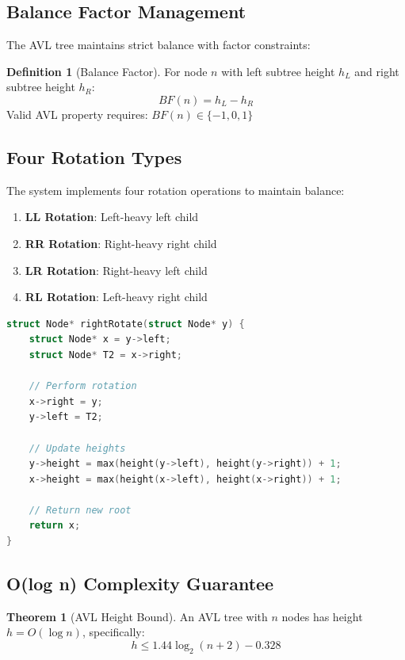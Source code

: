 \documentclass[12pt,a4paper]{report}
\theoremstyle{definition}
\newtheorem{definition}{Definition}[chapter]
\newtheorem{theorem}{Theorem}[chapter]
\begin{document}
\subsection{Balance Factor Management}

The AVL tree maintains strict balance with factor constraints:

\begin{definition}[Balance Factor]
For node $n$ with left subtree height $h_L$ and right subtree height $h_R$:
$$BF(n) = h_L - h_R$$
Valid AVL property requires: $BF(n) \in \{-1, 0, 1\}$
\end{definition}

\subsection{Four Rotation Types}

The system implements four rotation operations to maintain balance:

\begin{enumerate}
    \item \textbf{LL Rotation}: Left-heavy left child
    \item \textbf{RR Rotation}: Right-heavy right child
    \item \textbf{LR Rotation}: Right-heavy left child
    \item \textbf{RL Rotation}: Left-heavy right child
\end{enumerate}

\begin{lstlisting}[language=C, caption=AVL Rotation Implementation]
struct Node* rightRotate(struct Node* y) {
    struct Node* x = y->left;
    struct Node* T2 = x->right;
    
    // Perform rotation
    x->right = y;
    y->left = T2;
    
    // Update heights
    y->height = max(height(y->left), height(y->right)) + 1;
    x->height = max(height(x->left), height(x->right)) + 1;
    
    // Return new root
    return x;
}
\end{lstlisting}

\subsection{O(log n) Complexity Guarantee}

\begin{theorem}[AVL Height Bound]
An AVL tree with $n$ nodes has height $h = O(\log n)$, specifically:
$$h \leq 1.44 \log_2(n+2) - 0.328$$
\end{theorem}
\end{document}

